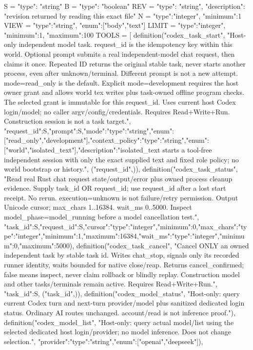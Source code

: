 S = {"type": "string"}
B = {"type": "boolean"}
REV = {"type": "string", "description": "revision returned by reading this exact file"}
N = {"type":"integer", "minimum":1}
VIEW = {"type":"string", "enum":["body","text"]}
LIMIT = {"type":"integer", "minimum":1, "maximum":100}
TOOLS = [
    definition("codex_task_start", "Host-only independent model task. request_id is the idempotency key within this world. Optional prompt submits a real independent-model chat request, then claims it once. Repeated ID returns the original stable task, never starts another process, even after unknown/terminal. Different prompt is not a new attempt. mode=read_only is the default. Explicit mode=development requires the host owner grant and allows world tex writes plus task-owned offline program checks. The selected grant is immutable for this request_id. Uses current host Codex login/model; no caller argv/config/credentials. Requires Read+Write+Run. Construction session is not a task target.", {"request_id":S,"prompt":S,"mode":{"type":"string","enum":["read_only","development"]},"context_policy":{"type":"string","enum":["world","isolated_text"],"description":"isolated_text starts a tool-free independent session with only the exact supplied text and fixed role policy; no world bootstrap or history."}}, ("request_id",)),
    definition("codex_task_status", "Read real Rust chat request state/output/error plus owned process cleanup evidence. Supply task_id OR request_id; use request_id after a lost start receipt. No rerun. execution=unknown is not failure/retry permission. Output Unicode cursor; max_chars 1..16384. wait_ms 0..5000. Inspect model_phase=model_running before a model cancellation test.", {"task_id":S,"request_id":S,"cursor":{"type":"integer","minimum":0},"max_chars":{"type":"integer","minimum":1,"maximum":16384},"wait_ms":{"type":"integer","minimum":0,"maximum":5000}}),
    definition("codex_task_cancel", "Cancel ONLY an owned independent task by stable task id. Writes chat_stop, signals only its recorded runner identity, waits bounded for native close/reap. Returns cancel_confirmed; false means inspect, never claim rollback or blindly replay. Construction model and other tasks/terminals remain active. Requires Read+Write+Run.", {"task_id":S}, ("task_id",)),
    definition("codex_model_status", "Host-only: query current Codex turn and next-turn provider/model plus sanitized dedicated login status. Ordinary AI routes unchanged. account/read is not inference proof."),
    definition("codex_model_list", "Host-only: query actual model/list using the selected dedicated host login/provider; no model inference. Does not change selection.", {"provider":{"type":"string","enum":["openai","deepseek"]}}),
